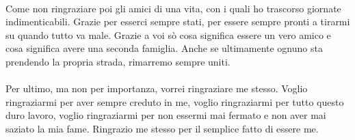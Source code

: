 \paragraph{}
Come non ringraziare poi gli amici di una vita, con i quali ho trascorso giornate indimenticabili. Grazie per esserci sempre stati, per essere sempre pronti a tirarmi su quando tutto va male. Grazie a voi sò cosa significa essere un vero amico e cosa significa avere una seconda famiglia. Anche se ultimamente ognuno sta prendendo la propria strada, rimarremo sempre uniti.

\paragraph{}
Per ultimo, ma non per importanza, vorrei ringraziare me stesso. Voglio ringraziarmi per aver sempre creduto in me, voglio ringraziarmi per tutto questo duro lavoro, voglio ringraziarmi per non essermi mai fermato e non aver mai saziato la mia fame. Ringrazio me stesso per il semplice fatto di essere me.